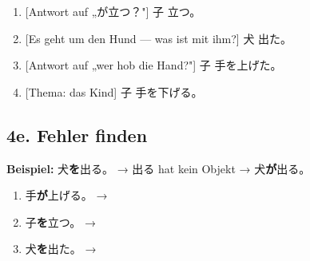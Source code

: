 \documentclass[11pt,a4paper,DIV=12]{scrartcl}
\begin{document}
\begin{enumerate}[itemsep=8pt]
\item {}[Antwort auf „が立つ？"] 子 \lin[0.8cm] 立つ。
\item {}[Es geht um den Hund — was ist mit ihm?] 犬 \lin[0.8cm] 出た。
\item {}[Antwort auf „wer hob die Hand?"] 子 \lin[0.8cm] 手を上げた。
\item {}[Thema: das Kind] 子 \lin[0.8cm] 手を下げる。
\end{enumerate}

\subsection*{4e. Fehler finden}

\textbf{Beispiel:} 犬\textbf{を}出る。 → 出る hat kein Objekt → 犬\textbf{が}出る。

\begin{enumerate}[itemsep=8pt]
\item 手\textbf{が}上げる。 → \lin[6cm]
\item 子\textbf{を}立つ。 → \lin[6cm]
\item 犬\textbf{を}出た。 → \lin[6cm]
\end{enumerate}
\end{document}
